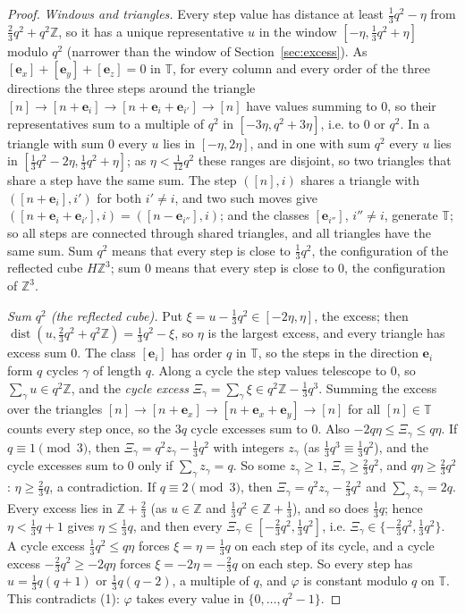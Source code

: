 \documentclass[11pt]{amsart}
\theoremstyle{definition}
\theoremstyle{plain}
\newcommand{\Z}{\mathbb{Z}}
\newcommand{\e}{\mathbf{e}}
\begin{document}
\begin{proof}
\emph{Windows and triangles.} Every step value has distance at least $\frac13q^2-\eta$ from $\frac23q^2+q^2\Z$, so it has a unique representative $u$ in the window $[-\eta,\frac13q^2+\eta]$ modulo $q^2$ (narrower than the window of Section~\ref{sec:excess}). As $[\e_x]+[\e_y]+[\e_z]=0$ in $\mathbb T$, for every column and every order of the three directions the three steps around the triangle $[n]\to[n+\e_i]\to[n+\e_i+\e_{i'}]\to[n]$ have values summing to $0$, so their representatives sum to a multiple of $q^2$ in $[-3\eta,q^2+3\eta]$, i.e. to $0$ or $q^2$. In a triangle with sum $0$ every $u$ lies in $[-\eta,2\eta]$, and in one with sum $q^2$ every $u$ lies in $[\frac13q^2-2\eta,\frac13q^2+\eta]$; as $\eta<\frac1{12}q^2$ these ranges are disjoint, so two triangles that share a step have the same sum. The step $([n],i)$ shares a triangle with $([n+\e_i],i')$ for both $i'\ne i$, and two such moves give $([n+\e_i+\e_{i'}],i)=([n-\e_{i''}],i)$; and the classes $[\e_{i''}]$, $i''\ne i$, generate $\mathbb T$; so all steps are connected through shared triangles, and all triangles have the same sum. Sum $q^2$ means that every step is close to $\frac13q^2$, the configuration of the reflected cube $H\Z^3$; sum $0$ means that every step is close to $0$, the configuration of $\Z^3$.

\emph{Sum $q^2$ (the reflected cube).} Put $\xi=u-\frac13q^2\in[-2\eta,\eta]$, the excess; then $\operatorname{dist}(u,\frac23q^2+q^2\Z)=\frac13q^2-\xi$, so $\eta$ is the largest excess, and every triangle has excess sum $0$. The class $[\e_i]$ has order $q$ in $\mathbb T$, so the steps in the direction $\e_i$ form $q$ cycles $\gamma$ of length $q$. Along a cycle the step values telescope to $0$, so $\sum_{\gamma}u\in q^2\Z$, and the \emph{cycle excess} $\Xi_\gamma=\sum_\gamma\xi\in q^2\Z-\frac13q^3$. Summing the excess over the triangles $[n]\to[n+\e_x]\to[n+\e_x+\e_y]\to[n]$ for all $[n]\in \mathbb T$ counts every step once, so the $3q$ cycle excesses sum to $0$. Also $-2q\eta\le\Xi_\gamma\le q\eta$.
If $q\equiv1\pmod3$, then $\Xi_\gamma=q^2z_\gamma-\frac13q^2$ with integers $z_\gamma$ (as $\frac13q^3\equiv\frac13q^2$), and the cycle excesses sum to $0$ only if $\sum_\gamma z_\gamma=q$. So some $z_\gamma\ge1$, $\Xi_\gamma\ge\frac23q^2$, and $q\eta\ge\frac23q^2$: $\eta\ge\frac23q$, a contradiction.
If $q\equiv2\pmod3$, then $\Xi_\gamma=q^2z_\gamma-\frac23q^2$ and $\sum_\gamma z_\gamma=2q$. Every excess lies in $\Z+\frac23$ (as $u\in\Z$ and $\frac13q^2\in\Z+\frac13$), and so does $\frac13q$; hence $\eta<\frac13q+1$ gives $\eta\le\frac13q$, and then every $\Xi_\gamma\in[-\frac23q^2,\frac13q^2]$, i.e. $\Xi_\gamma\in\{-\frac23q^2,\frac13q^2\}$. A cycle excess $\frac13q^2\le q\eta$ forces $\xi=\eta=\frac13q$ on each step of its cycle, and a cycle excess $-\frac23q^2\ge-2q\eta$ forces $\xi=-2\eta=-\frac23q$ on each step. So every step has $u=\frac13q(q+1)$ or $\frac13q(q-2)$, a multiple of $q$, and $\varphi$ is constant modulo $q$ on $\mathbb T$. This contradicts (1): $\varphi$ takes every value in $\{0,\dots,q^2-1\}$.


\end{proof}
\end{document}
